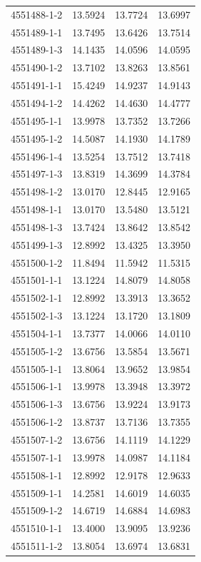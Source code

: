 \begin{longtable}{lrrr}
4551488-1-2 & 13.5924 & 13.7724 & 13.6997 \\
4551489-1-1 & 13.7495 & 13.6426 & 13.7514 \\
4551489-1-3 & 14.1435 & 14.0596 & 14.0595 \\
4551490-1-2 & 13.7102 & 13.8263 & 13.8561 \\
4551491-1-1 & 15.4249 & 14.9237 & 14.9143 \\
4551494-1-2 & 14.4262 & 14.4630 & 14.4777 \\
4551495-1-1 & 13.9978 & 13.7352 & 13.7266 \\
4551495-1-2 & 14.5087 & 14.1930 & 14.1789 \\
4551496-1-4 & 13.5254 & 13.7512 & 13.7418 \\
4551497-1-3 & 13.8319 & 14.3699 & 14.3784 \\
4551498-1-2 & 13.0170 & 12.8445 & 12.9165 \\
4551498-1-1 & 13.0170 & 13.5480 & 13.5121 \\
4551498-1-3 & 13.7424 & 13.8642 & 13.8542 \\
4551499-1-3 & 12.8992 & 13.4325 & 13.3950 \\
4551500-1-2 & 11.8494 & 11.5942 & 11.5315 \\
4551501-1-1 & 13.1224 & 14.8079 & 14.8058 \\
4551502-1-1 & 12.8992 & 13.3913 & 13.3652 \\
4551502-1-3 & 13.1224 & 13.1720 & 13.1809 \\
4551504-1-1 & 13.7377 & 14.0066 & 14.0110 \\
4551505-1-2 & 13.6756 & 13.5854 & 13.5671 \\
4551505-1-1 & 13.8064 & 13.9652 & 13.9854 \\
4551506-1-1 & 13.9978 & 13.3948 & 13.3972 \\
4551506-1-3 & 13.6756 & 13.9224 & 13.9173 \\
4551506-1-2 & 13.8737 & 13.7136 & 13.7355 \\
4551507-1-2 & 13.6756 & 14.1119 & 14.1229 \\
4551507-1-1 & 13.9978 & 14.0987 & 14.1184 \\
4551508-1-1 & 12.8992 & 12.9178 & 12.9633 \\
4551509-1-1 & 14.2581 & 14.6019 & 14.6035 \\
4551509-1-2 & 14.6719 & 14.6884 & 14.6983 \\
4551510-1-1 & 13.4000 & 13.9095 & 13.9236 \\
4551511-1-2 & 13.8054 & 13.6974 & 13.6831 \\

\end{longtable}
